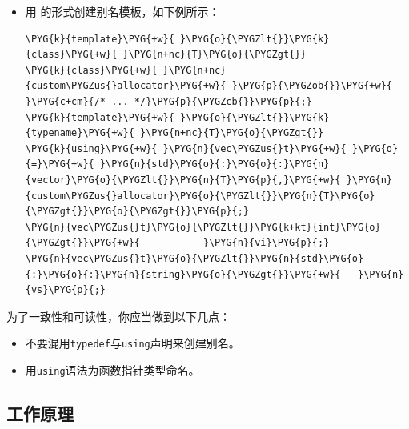 \begin{itemize}

\item 用 的形式创建别名模板，如下例所示：



\begin{codeblockbg}
\begin{Verbatim}[commandchars=\\\{\},breaklines=true,breakanywhere=true,fontsize=\codefont,xleftmargin=17bp]
\PYG{k}{template}\PYG{+w}{ }\PYG{o}{\PYGZlt{}}\PYG{k}{class}\PYG{+w}{ }\PYG{n+nc}{T}\PYG{o}{\PYGZgt{}}
\PYG{k}{class}\PYG{+w}{ }\PYG{n+nc}{custom\PYGZus{}allocator}\PYG{+w}{ }\PYG{p}{\PYGZob{}}\PYG{+w}{ }\PYG{c+cm}{/* ... */}\PYG{p}{\PYGZcb{}}\PYG{p}{;}
\PYG{k}{template}\PYG{+w}{ }\PYG{o}{\PYGZlt{}}\PYG{k}{typename}\PYG{+w}{ }\PYG{n+nc}{T}\PYG{o}{\PYGZgt{}}
\PYG{k}{using}\PYG{+w}{ }\PYG{n}{vec\PYGZus{}t}\PYG{+w}{ }\PYG{o}{=}\PYG{+w}{ }\PYG{n}{std}\PYG{o}{:}\PYG{o}{:}\PYG{n}{vector}\PYG{o}{\PYGZlt{}}\PYG{n}{T}\PYG{p}{,}\PYG{+w}{ }\PYG{n}{custom\PYGZus{}allocator}\PYG{o}{\PYGZlt{}}\PYG{n}{T}\PYG{o}{\PYGZgt{}}\PYG{o}{\PYGZgt{}}\PYG{p}{;}
\PYG{n}{vec\PYGZus{}t}\PYG{o}{\PYGZlt{}}\PYG{k+kt}{int}\PYG{o}{\PYGZgt{}}\PYG{+w}{           }\PYG{n}{vi}\PYG{p}{;}
\PYG{n}{vec\PYGZus{}t}\PYG{o}{\PYGZlt{}}\PYG{n}{std}\PYG{o}{:}\PYG{o}{:}\PYG{n}{string}\PYG{o}{\PYGZgt{}}\PYG{+w}{   }\PYG{n}{vs}\PYG{p}{;}
\end{Verbatim}
\end{codeblockbg}

\end{itemize}



为了一致性和可读性，你应当做到以下几点：



\begin{itemize}
\item 不要混用\texttt{typedef}与\texttt{using}声明来创建别名。



\item 用\texttt{using}语法为函数指针类型命名。

\end{itemize}



\subsection{工作原理}


